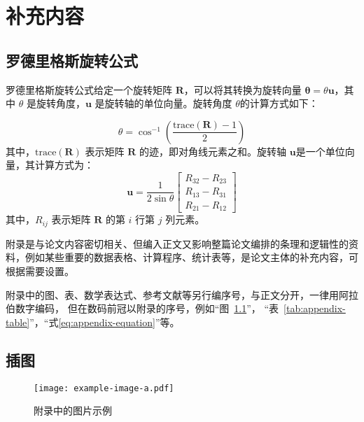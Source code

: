 
\chapter{补充内容}
\label{appendix:quat}

\section{罗德里格斯旋转公式}
罗德里格斯旋转公式给定一个旋转矩阵 \( \symbf{R} \)，可以将其转换为旋转向量 \( \boldsymbol{\theta} = \theta \symbf{u} \)，其中 \( \theta \) 是旋转角度，\( \symbf{u} \) 是旋转轴的单位向量。旋转角度 \( \theta \)的计算方式如下：

\begin{equation}
\theta = \cos^{-1} \left( \frac{\text{trace}(\symbf{R}) - 1}{2} \right)
\end{equation}
其中，\( \text{trace}(\symbf{R}) \) 表示矩阵 \( \symbf{R} \) 的迹，即对角线元素之和。旋转轴 \( \symbf{u} \)是一个单位向量，其计算方式为：
\begin{equation}
\symbf{u} = \frac{1}{2 \sin \theta} \begin{bmatrix}
R_{32} - R_{23} \\
R_{13} - R_{31} \\
R_{21} - R_{12}
\end{bmatrix}
\end{equation}
其中，\( R_{ij} \) 表示矩阵 \( \symbf{R} \) 的第 \( i \) 行第 \( j \) 列元素。


附录是与论文内容密切相关、但编入正文又影响整篇论文编排的条理和逻辑性的资料，例如某些重要的数据表格、计算程序、统计表等，是论文主体的补充内容，可根据需要设置。

附录中的图、表、数学表达式、参考文献等另行编序号，与正文分开，一律用阿拉伯数字编码，
但在数码前冠以附录的序号，例如“图~\ref{fig:appendix-figure}”，
“表~\ref{tab:appendix-table}”，“式\eqref{eq:appendix-equation}”等。


\section{插图}


\begin{figure}
  \centering
  \texttt{[image: example-image-a.pdf]}
  \caption{附录中的图片示例}
  \label{fig:appendix-figure}
\end{figure}


